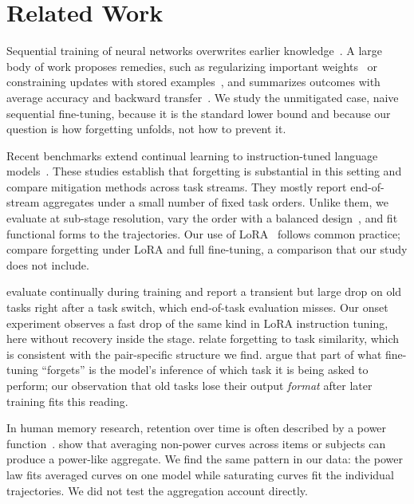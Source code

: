 \section{Related Work}
\label{sec:related}

Sequential training of neural networks overwrites earlier knowledge~\cite{mccloskey1989catastrophic}.
A large body of work proposes remedies, such as regularizing important weights~\cite{kirkpatrick2017overcoming} or constraining updates with stored examples~\cite{lopezpaz2017gradient}, and summarizes outcomes with average accuracy and backward transfer~\cite{lopezpaz2017gradient}.
We study the unmitigated case, naive sequential fine-tuning, because it is the standard lower bound and because our question is how forgetting unfolds, not how to prevent it.

Recent benchmarks extend continual learning to instruction-tuned language models~\cite{scialom2022fine,zhang2023citb,wang2023trace,luo2023empirical}.
These studies establish that forgetting is substantial in this setting and compare mitigation methods across task streams.
They mostly report end-of-stream aggregates under a small number of fixed task orders.
Unlike them, we evaluate at sub-stage resolution, vary the order with a balanced design~\cite{williams1949experimental}, and fit functional forms to the trajectories.
Our use of LoRA~\cite{hu2022lora} follows common practice; \citet{biderman2024lora} compare forgetting under LoRA and full fine-tuning, a comparison that our study does not include.

\citet{delange2023continual} evaluate continually during training and report a transient but large drop on old tasks right after a task switch, which end-of-task evaluation misses.
Our onset experiment observes a fast drop of the same kind in LoRA instruction tuning, here without recovery inside the stage.
\citet{ramasesh2021anatomy} relate forgetting to task similarity, which is consistent with the pair-specific structure we find.
\citet{kotha2024understanding} argue that part of what fine-tuning ``forgets'' is the model's inference of which task it is being asked to perform; our observation that old tasks lose their output \emph{format} after later training fits this reading.

In human memory research, retention over time is often described by a power function~\cite{wixted1991form}.
\citet{anderson1997artifactual} show that averaging non-power curves across items or subjects can produce a power-like aggregate.
We find the same pattern in our data: the power law fits averaged curves on one model while saturating curves fit the individual trajectories.
We did not test the aggregation account directly.
